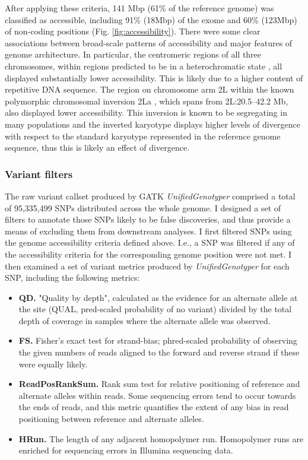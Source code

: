 \documentclass[a4paper,11pt,abstracton,hidelinks]{scrartcl}
\begin{document}
After applying these criteria, 141 Mbp (61\% of the reference genome) was classified as accessible, including 91\% (18Mbp) of the exome and 60\% (123Mbp) of non-coding positions (Fig. \ref{fig:accessibility}).
%
There were some clear associations between broad-scale patterns of accessibility and major features of genome architecture.
%
In particular, the centromeric regions of all three chromosomes, within regions predicted to be in a heterochromatic state \citep{Sharakhova2010}, all displayed substantially lower accessibility.
%
This is likely due to a higher content of repetitive DNA sequence.
%
The region on chromosome arm 2L within the known polymorphic chromosomal inversion 2La \citep{Coluzzi2002}, which spans from 2L:20.5--42.2 Mb, also displayed lower accessibility.
%
This inversion is known to be segregating in many populations and the inverted karyotype displays higher levels of divergence with respect to the standard karyotype represented in the reference genome sequence, thus this is likely an effect of divergence.


\subsubsection{Variant filters}


The raw variant callset produced by GATK \textit{UnifiedGenotyper} comprised a total of 95,335,499 SNPs distributed across the whole genome.
%
I designed a set of filters to annotate those SNPs likely to be false discoveries, and thus provide a means of excluding them from downstream analyses.
%
I first filtered SNPs using the genome accessibility criteria defined above.
%
I.e., a SNP was filtered if any of the accessibility criteria for the corresponding genome position were not met.
%
I then examined a set of variant metrics produced by \textit{UnifiedGenotyper} for each SNP, including the following metrics:
%
\begin{itemize}
%
\item \textbf{QD.} "Quality by depth", calculated as the evidence for an alternate allele at the site (QUAL, pred-scaled probability of no variant) divided by the total depth of coverage in samples where the alternate allele was observed. 
%
\item \textbf{FS.} Fisher's exact test for strand-bias; phred-scaled probability of observing the given numbers of reads aligned to the forward and reverse strand if these were equally likely.
%
\item \textbf{ReadPosRankSum.} Rank sum test for relative positioning of reference and alternate alleles within reads. Some sequencing errors tend to occur towards the ends of reads, and this metric quantifies the extent of any bias in read positioning between reference and alternate alleles.
%
\item \textbf{HRun.} The length of any adjacent homopolymer run. Homopolymer runs are enriched for sequencing errors in Illumina sequencing data. 
%
\end{itemize}
\end{document}
